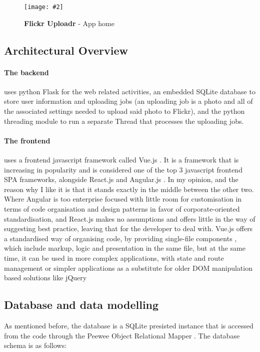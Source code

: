 \documentclass[10pt, a4paper]{article}
\newcommand{\figuremacro}[5]{
\begin{figure}[#1]
\centering
\texttt{[image: \#2]}
\caption[#3]{\textbf{#3}#4}
\label{fig:#2}
\end{figure}
}
\begin{document}
        \figuremacro{h}{app}{Flickr Uploadr}{ - App home}{1.0}

        \subsection{Architectural Overview}
        \paragraph{The backend} uses python Flask \cite{Flask} for the web related activities, an embedded SQLite\cite{SQLite} database to store user information and uploading jobs (an uploading job is a photo and all of the associated settings needed to upload said photo to Flickr), and the python threading module to run a separate Thread that processes the uploading jobs.

        \paragraph{The frontend} uses a frontend javascript framework called Vue.js \cite{Vue.js}. It is a framework that is increasing in popularity and is considered one of the top 3 javascript frontend SPA frameworks, alongside React.js \cite{React.js} and Angular.js \cite{Angular.js}.
        In my opinion, and the reason why I like it is that it stands exactly in the middle between the other two. Where Angular is too enterprise focused with little room for customisation in terms of code organisation and design patterns in favor of corporate-oriented standardisation, and React.js makes no assumptions and offers little in the way of suggesting best practice, leaving that for the developer to deal with.
        Vue.js offers a standardised way of organising code, by providing single-file components \cite{single_file_components}, which include markup, logic and presentation in the same file, but at the same time, it can be used in more complex applications, with state \cite{Vuex} and route \cite{Vue_Router} management or simpler applications as a substitute for older DOM manipulation based solutions like jQuery \cite{jquery_vue}


        \subsection{Database and data modelling}
        As mentioned before, the database is a SQLite presisted instance that is accessed from the code through the Peewee Object Relational Mapper \cite{peewee}. The database schema is as follows:
\end{document}
